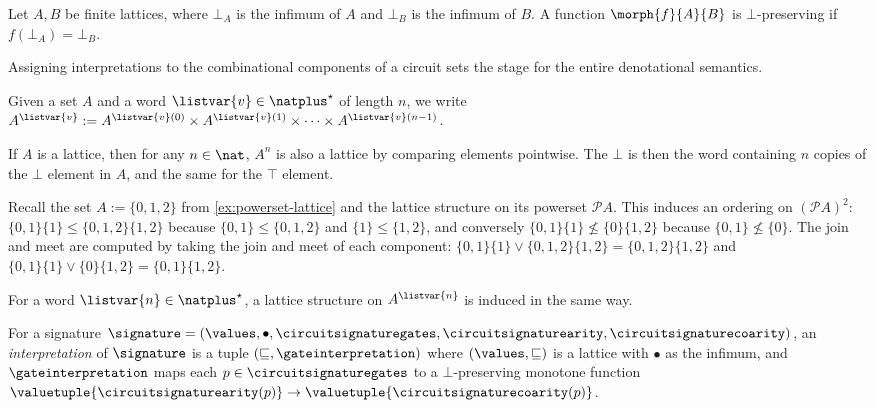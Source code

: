 \begin{definition}
    Let \(A,B\) be finite lattices, where \(\bot_A\) is the infimum of \(A\) and
    \(\bot_B\) is the infimum of \(B\).
    A function \(\morph{f}{A}{B}\) is \(\bot\)-preserving if
    \(f(\bot_A) = \bot_B\).
\end{definition}

Assigning interpretations to the combinational components of a circuit sets the
stage for the entire denotational semantics.

\begin{notation}
    Given a set \(A\) and a word \(\listvar{v} \in \natplus^\star\) of
    length \(n\), we write \(
        A^{\listvar{v}}
        :=
        A^{\listvar{v}(0)}
        \times
        A^{\listvar{v}(1)}
        \times
        \dots
        \times
        A^{\listvar{v}(n-1)}
    \).
\end{notation}

\begin{remark}
    If \(A\) is a lattice, then for any \(n \in \nat\), \(A^n\) is also a
    lattice by comparing elements pointwise.
    The \(\bot\) is then the word containing \(n\) copies of the \(\bot\)
    element in \(A\), and the same for the \(\top\) element.

    Recall the set \(A := \{0,1,2\}\) from
    \cref{ex:powerset-lattice} and the lattice structure on its powerset
    \(\mathcal{P}A\).
    This induces an ordering on \((\mathcal{P}A)^2\):
    \(\{0,1\}\{1\} \leq \{0,1,2\}\{1,2\}\) because \(\{0,1\} \leq \{0,1,2\}\)
    and \(\{1\} \leq \{1,2\}\), and conversely
    \(\{0,1\}\{1\} \not\leq \{0\}\{1,2\}\) because \(\{0,1\} \not\leq \{0\}\).
    The join and meet are computed by taking the join and meet of each
    component: \(
        \{0,1\}\{1\} \vee \{0,1,2\}\{1,2\} = \{0,1,2\}\{1,2\}
    \) and \(
        \{0,1\}\{1\} \vee \{0\}\{1,2\} = \{0,1\}\{1,2\}
    \).

    For a word \(\listvar{n} \in \natplus^\star\), a lattice
    structure on \(A^{\listvar{n}}\) is induced in the same way.
\end{remark}

\begin{definition}[Interpretation]
    For a signature \(
        \signature = (
            \values, \bullet, \circuitsignaturegates, \circuitsignaturearity,
            \circuitsignaturecoarity
    )\), an \emph{interpretation} of
    \(\signature\) is a tuple \((\sqsubseteq, \gateinterpretation)\) where
    \((\values, \sqsubseteq)\) is a lattice with \(\bullet\) as the
    infimum, and \(\gateinterpretation\) maps each
    \(p \in \circuitsignaturegates\) to a \(\bot\)-preserving monotone function
    \(
        \valuetuple{\circuitsignaturearity(p)}
        \to
        \valuetuple{\circuitsignaturecoarity(p)}
    \).
\end{definition}

